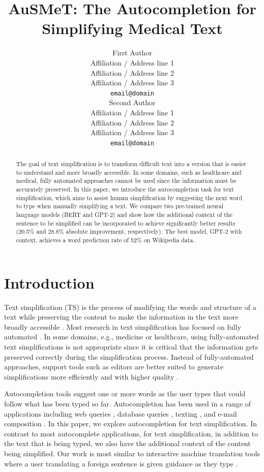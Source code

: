 \documentclass[11pt]{article}
\title{AuSMeT: The Autocompletion for Simplifying Medical Text}
\author{First Author \\
  Affiliation / Address line 1 \\
  Affiliation / Address line 2 \\
  Affiliation / Address line 3 \\
  {\tt email@domain} \\\And
  Second Author \\
  Affiliation / Address line 1 \\
  Affiliation / Address line 2 \\
  Affiliation / Address line 3 \\
  {\tt email@domain} \\}
\date{}
\begin{document}
\maketitle
\begin{abstract}
  The goal of text simplification is to transform difficult text into a version that is easier to understand and more broadly accessible.  In some domains, such as healthcare and medical, fully automated approaches cannot be used since the information must be accurately preserved.  In this paper, we introduce the autocompletion task for text simplification, which aims to assist human simplification by suggesting the next word to type when manually simplifying a text.  We compare two pre-trained neural language models (BERT and GPT-2) and show how the additional context of the sentence to be simplified can be incorporated to achieve significantly better results (20.5\% and 28.8\% absolute improvement, respectively).  The best model, GPT-2 with context, achieves a word prediction rate of 52\% on Wikipedia data.

\end{abstract}

\section{Introduction}

Text simplification (TS) is the process of modifying the words and structure of a text while preserving the content to make the information in the text more broadly accessible \cite{shardlow2014survey}.  Most research in text simplification has focused on fully automated \cite{zhu10,coster2011learning,xu2016optimizing,zhang2017sentence,nishihara2019controllable}.  In some domains, e.g., medicine or healthcare, using fully-automated text simplifications is not appropriate since it is critical that the information gets preserved correctly during the simplification process. Instead of fully-automated approaches, support tools such as editors are better suited to generate simplifications more efficiently and with higher quality \cite{kloehn2018jmir}.

Autocompletion tools suggest one or more words as the user types that could follow what has been typed so far.  Autocompletion has been used in a range of applications including web queries \cite{cai2016survey}, database queries \cite{khoussainova2010snipsuggest}, texting \cite{dunlop2000predictive}, and e-mail composition \cite{dai2019gmail}. In this paper, we explore autocompletion for text simplification.  In contrast to most autocomplete applications, for text simplification, in addition to the text that is being typed, we also have the additional context of the content being simplified.  Our work is most similar to interactive machine translation tools where a user translating a foreign sentence is given guidance as they type \cite{green-etal-2014-human}.
\end{document}
